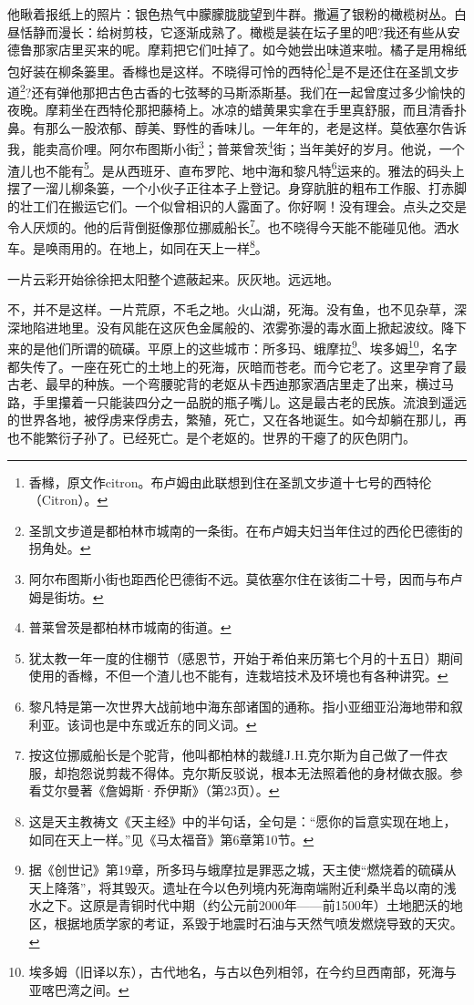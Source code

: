 \par 他瞅着报纸上的照片：银色热气中朦朦胧胧望到牛群。撒遍了银粉的橄榄树丛。白昼恬静而漫长：给树剪枝，它逐渐成熟了。橄榄是装在坛子里的吧?我还有些从安德鲁那家店里买来的呢。摩莉把它们吐掉了。如今她尝出味道来啦。橘子是用棉纸包好装在柳条篓里。香橼也是这样。不晓得可怜的西特伦\footnote{香橼，原文作citron。布卢姆由此联想到住在圣凯文步道十七号的西特伦（Citron）。}是不是还住在圣凯文步道\footnote{圣凯文步道是都柏林市城南的一条街。在布卢姆夫妇当年住过的西伦巴德街的拐角处。}?还有弹他那把古色古香的七弦琴的马斯添斯基。我们在一起曾度过多少愉快的夜晚。摩莉坐在西特伦那把藤椅上。冰凉的蜡黄果实拿在手里真舒服，而且清香扑鼻。有那么一股浓郁、醇美、野性的香味儿。一年年的，老是这样。莫依塞尔告诉我，能卖高价哩。阿尔布图斯小街\footnote{阿尔布图斯小街也距西伦巴德街不远。莫依塞尔住在该街二十号，因而与布卢姆是街坊。}；普莱曾茨\footnote{普莱曾茨是都柏林市城南的街道。}街；当年美好的岁月。他说，一个渣儿也不能有\footnote{犹太教一年一度的住棚节（感恩节，开始于希伯来历第七个月的十五日）期间使用的香橼，不但一个渣儿也不能有，连栽培技术及环境也有各种讲究。}。是从西班牙、直布罗陀、地中海和黎凡特\footnote{黎凡特是第一次世界大战前地中海东部诸国的通称。指小亚细亚沿海地带和叙利亚。该词也是中东或近东的同义词。}运来的。雅法的码头上摆了一溜儿柳条篓，一个小伙子正往本子上登记。身穿肮脏的粗布工作服、打赤脚的壮工们在搬运它们。一个似曾相识的人露面了。你好啊！没有理会。点头之交是令人厌烦的。他的后背倒挺像那位挪威船长\footnote{按这位挪威船长是个驼背，他叫都柏林的裁缝J.H.克尔斯为自己做了一件衣服，却抱怨说剪裁不得体。克尔斯反驳说，根本无法照着他的身材做衣服。参看艾尔曼著《詹姆斯·乔伊斯》（第23页）。}。也不晓得今天能不能碰见他。洒水车。是唤雨用的。在地上，如同在天上一样\footnote{这是天主教祷文《天主经》中的半句话，全句是：“愿你的旨意实现在地上，如同在天上一样。”见《马太福音》第6章第10节。}。
\par 一片云彩开始徐徐把太阳整个遮蔽起来。灰灰地。远远地。
\par 不，并不是这样。一片荒原，不毛之地。火山湖，死海。没有鱼，也不见杂草，深深地陷进地里。没有风能在这灰色金属般的、浓雾弥漫的毒水面上掀起波纹。降下来的是他们所谓的硫磺。平原上的这些城市：所多玛、蛾摩拉\footnote{据《创世记》第19章，所多玛与蛾摩拉是罪恶之城，天主使“燃烧着的硫磺从天上降落”，将其毁灭。遗址在今以色列境内死海南端附近利桑半岛以南的浅水之下。这原是青铜时代中期（约公元前2000年——前1500年）土地肥沃的地区，根据地质学家的考证，系毁于地震时石油与天然气喷发燃烧导致的天灾。}、埃多姆\footnote{埃多姆（旧译以东），古代地名，与古以色列相邻，在今约旦西南部，死海与亚喀巴湾之间。}，名字都失传了。一座在死亡的土地上的死海，灰暗而苍老。而今它老了。这里孕育了最古老、最早的种族。一个弯腰驼背的老妪从卡西迪那家酒店里走了出来，横过马路，手里攥着一只能装四分之一品脱的瓶子嘴儿。这是最古老的民族。流浪到遥远的世界各地，被俘虏来俘虏去，繁殖，死亡，又在各地诞生。如今却躺在那儿，再也不能繁衍子孙了。已经死亡。是个老妪的。世界的干瘪了的灰色阴门。
